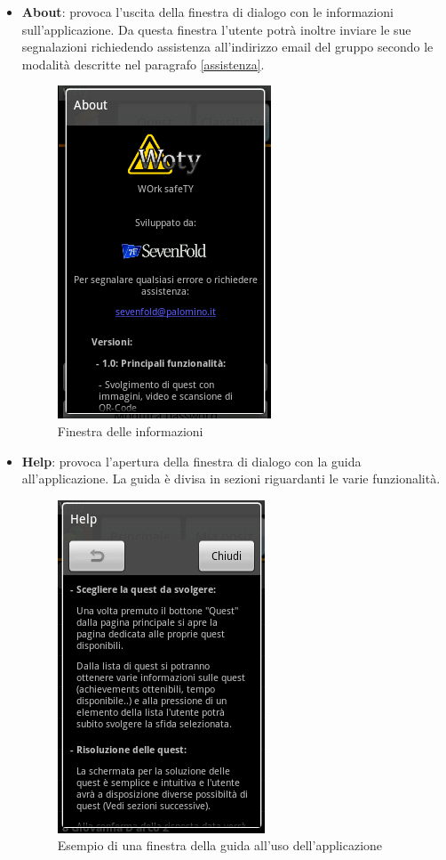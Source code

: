 \begin{itemize}
	\item \textbf{About}: provoca l'uscita della finestra di dialogo con le informazioni sull'applicazione. Da questa finestra l'utente potrà inoltre inviare le sue segnalazioni richiedendo assistenza all'indirizzo email del gruppo secondo le modalità descritte nel paragrafo \ref{assistenza}.

\begin{center}
\begin{figure}[H]
\centering
\includegraphics[scale=0.55]{images/about.png}
\caption{ Finestra delle informazioni }
\end{figure}
\end{center}	
	
	\item \textbf{Help}: provoca l'apertura della finestra di dialogo con la guida all'applicazione. La guida è divisa in sezioni riguardanti le varie funzionalità.
	
\begin{center}
\begin{figure}[H]
\centering
\includegraphics[scale=0.55]{images/help.png}
\caption{ Esempio di una finestra della guida all'uso dell'applicazione }
\end{figure}
\end{center}	
	

\end{itemize}
